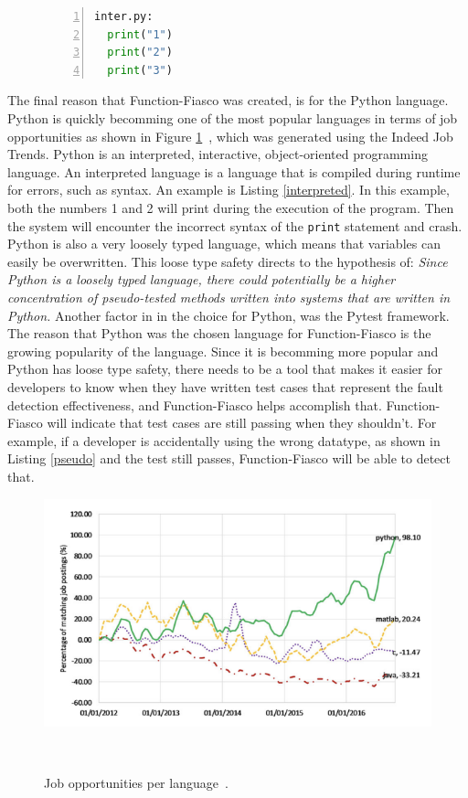\begin{figure}[t!]
\begin{lstlisting}[language = Python, numbers = left, frame = single, caption = Example of interpreted languages, label = interpreted]
inter.py:
  print("1")
  print("2")
  print("3")

\end{lstlisting}
\end{figure}

The final reason that Function-Fiasco was created, is for the Python language. Python is quickly becomming one of the most popular languages in terms of job opportunities as shown in Figure \ref{languageGrowth}~\cite{wang2017computer}, which was generated using the Indeed Job Trends. Python is an interpreted, interactive, object-oriented programming language\cite{sanner1999python}. An interpreted language is a language that is compiled during runtime for errors, such as syntax. An example is Listing \ref{interpreted}. In this example, both the numbers 1 and 2 will print during the execution of the program. Then the system will encounter the incorrect syntax of the \texttt{print} statement and crash. Python is also a very loosely typed language, which means that variables can easily be overwritten. This loose type safety directs to the hypothesis of: \emph{Since Python is a loosely typed language, there could potentially be a higher concentration of pseudo-tested methods written into systems that are written in Python.} Another factor in in the choice for Python, was the Pytest framework. The reason that Python was the chosen language for Function-Fiasco is the growing popularity of the language.  Since it is becomming more popular and Python has loose type safety, there needs to be a tool that makes it easier for developers to know when they have written test cases that represent the fault detection effectiveness, and Function-Fiasco helps accomplish that. Function-Fiasco will indicate that test cases are still passing when they shouldn't. For example, if a developer is accidentally using the wrong datatype, as shown in Listing \ref{pseudo} and the test still passes, Function-Fiasco will be able to detect that.
\begin{figure}[htbp]
  \centering
  \includegraphics[width=5in]{images/language-growth.png}
  \caption{Job opportunities per language~\cite{wang2017computer}.}~\label{languageGrowth}
\end{figure}




